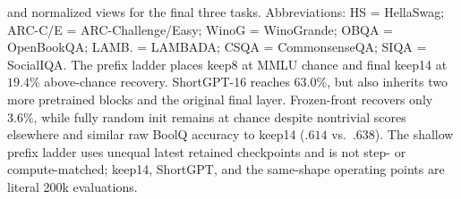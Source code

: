 \begin{table}[t]
{and normalized views for the final three tasks. Abbreviations: HS = HellaSwag;
ARC-C/E = ARC-Challenge/Easy; WinoG = WinoGrande; OBQA = OpenBookQA; LAMB. =
LAMBADA; CSQA = CommonsenseQA; SIQA = SocialIQA.
The prefix ladder places keep8 at MMLU chance and final keep14 at $19.4\%$
above-chance recovery. ShortGPT-16 reaches $63.0\%$, but also inherits two more
pretrained blocks and the original final layer. Frozen-front recovers only
$3.6\%$, while fully random init remains at chance despite nontrivial scores
elsewhere and similar raw BoolQ accuracy to keep14 ($.614$ vs.\ $.638$).
The shallow prefix ladder uses unequal latest retained checkpoints and is not
step- or compute-matched; keep14, ShortGPT, and the same-shape operating points are
literal 200k evaluations.}
\label{tab:downstream}
\end{table}
